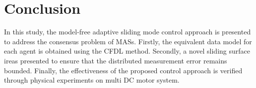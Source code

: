\documentclass[journal,onecolumn]{IEEEtran}
\begin{document}
\section{Conclusion}

In this study, the model-free adaptive sliding mode control approach is presented to address the consensus problem of MASs. Firstly, the equivalent data model for each agent is obtained using the CFDL method. Secondly, a novel sliding surface ireas presented to ensure that the distributed measurement error remains bounded. Finally, the effectiveness of the proposed control approach is verified through physical experiments on multi DC motor system.








\end{document}
